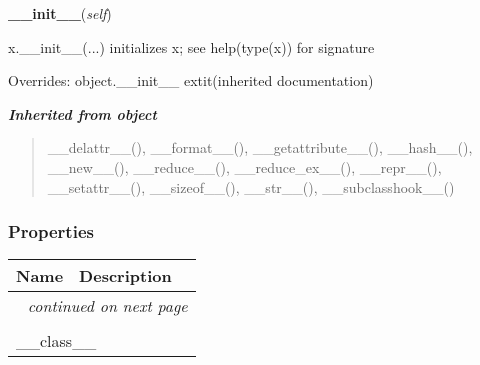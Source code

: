     \vspace{0.5ex}

\hspace{.8\funcindent}\begin{boxedminipage}{\funcwidth}

    \raggedright \textbf{\_\_init\_\_}(\textit{self})

\setlength{\parskip}{2ex}
    x.\_\_init\_\_(...) initializes x; see help(type(x)) for signature

\setlength{\parskip}{1ex}
      Overrides: object.\_\_init\_\_ 	extit{(inherited documentation)}

    \end{boxedminipage}


\large{\textbf{\textit{Inherited from object}}}

\begin{quote}
\_\_delattr\_\_(), \_\_format\_\_(), \_\_getattribute\_\_(), \_\_hash\_\_(), \_\_new\_\_(), \_\_reduce\_\_(), \_\_reduce\_ex\_\_(), \_\_repr\_\_(), \_\_setattr\_\_(), \_\_sizeof\_\_(), \_\_str\_\_(), \_\_subclasshook\_\_()
\end{quote}


  \subsubsection{Properties}

    \vspace{-1cm}
\hspace{\varindent}\begin{longtable}{|p{\varnamewidth}|p{\vardescrwidth}|l}
\cline{1-2}
\cline{1-2} \centering \textbf{Name} & \centering \textbf{Description}& \\
\cline{1-2}
\endhead\cline{1-2}\multicolumn{3}{r}{\small\textit{continued on next page}}\\\endfoot\cline{1-2}
\endlastfoot\multicolumn{2}{|l|}{\textit{Inherited from object}}\\
\multicolumn{2}{|p{\varwidth}|}{\raggedright \_\_class\_\_}\\
\cline{1-2}
\end{longtable}



